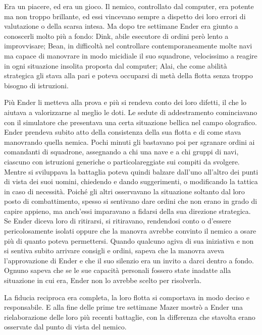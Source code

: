 {Era un piacere, ed era un gioco. Il nemico, controllato dal computer,
	era potente ma non troppo brillante, ed essi vincevano sempre a dispetto
	dei loro errori di valutazione o della scarsa intesa. Ma dopo tre
	settimane Ender era giunto a conoscerli molto più a fondo: Dink, abile
	esecutore di ordini però lento a improvvisare; Bean, in difficoltà nel
	controllare contemporaneamente molte navi ma capace di manovrare in modo
	micidiale il suo squadrone, velocissimo a reagire in ogni situazione
	insolita proposta dal computer; Alai, che come abilità strategica gli
	stava alla pari e poteva occuparsi di metà della flotta senza troppo
	bisogno di istruzioni.}

{Più Ender li metteva alla prova e più si rendeva conto dei loro
	difetti, il che lo aiutava a valorizzarne al meglio le doti. Le sedute
	di addestramento cominciavano con il simulatore che presentava una certa
	situazione bellica nel campo olografico. Ender prendeva subito atto
	della consistenza della sua flotta e di come stava manovrando quella
	nemica. Pochi minuti gli bastavano poi per sgranare ordini ai comandanti
	di squadrone, assegnando a chi una nave e a chi gruppi di navi, ciascuno
	con istruzioni generiche o particolareggiate sui compiti da svolgere.
	Mentre si sviluppava la battaglia poteva quindi balzare dall'uno
	all'altro dei punti di vista dei suoi uomini, chiedendo e dando
	suggerimenti, o modificando la tattica in caso di necessità. Poiché gli
	altri osservavano la situazione soltanto dal loro posto di
	combattimento, spesso si sentivano dare ordini che non erano in grado di
	capire appieno, ma anch'essi imparavano a fidarsi della sua direzione
	strategica. Se Ender diceva loro di ritirarsi, si ritiravano, rendendosi
	conto o d'essere pericolosamente isolati oppure che la manovra avrebbe
	convinto il nemico a osare più di quanto poteva permettersi. Quando
	qualcuno agiva di sua iniziativa e non si sentiva subito arrivare
	consigli e ordini, sapeva che la manovra aveva l'approvazione di Ender e
	che il suo silenzio era un invito a darci dentro a fondo. Ognuno sapeva
	che se le sue capacità personali fossero state inadatte alla situazione
	in cui era, Ender non lo avrebbe scelto per risolverla.}

{La fiducia reciproca era completa, la loro flotta si comportava in modo
	deciso e responsabile. E alla fine delle prime tre settimane Mazer
	mostrò a Ender una rielaborazione delle loro più recenti battaglie, con
	la differenza che stavolta erano osservate dal punto di vista del
	nemico.}

